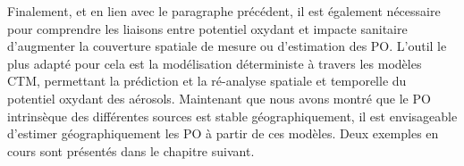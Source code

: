 Finalement, et en lien avec le paragraphe précédent, il est également nécessaire pour
comprendre les liaisons entre potentiel oxydant et impacte sanitaire d'augmenter la
couverture spatiale de mesure ou d'estimation des PO. L'outil le plus adapté pour cela est
la modélisation déterministe à travers les modèles CTM, permettant la prédiction et la
ré-analyse spatiale et temporelle du potentiel oxydant des aérosols. Maintenant que nous
avons montré que le PO intrinsèque des différentes sources est stable géographiquement,
il est envisageable d'estimer géographiquement les PO à partir de ces modèles. Deux
exemples en cours sont présentés dans le chapitre suivant.

